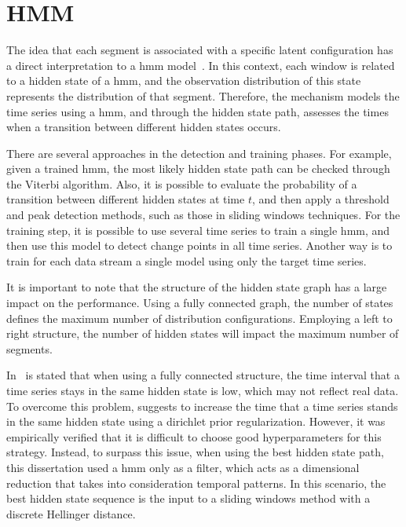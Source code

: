\section{HMM}

The idea that each segment is associated with a specific latent configuration
has a direct interpretation to a \gls*{hmm}
model~\cite{a_hidden_markov_model_segmentation_procedure_for_hydrological_and_environmental_time_series, fast_estimation_of_posterior_probabilities_in_change-point_analysis_through_a_constrained_hidden_markov_model, inertial_hidden_markov_models_modeling_change_in_multivariate_time_series}.
In this context, each window is related to a hidden state of a \gls*{hmm}, and the
observation distribution of this state represents the distribution of that
segment. Therefore, the mechanism models the time series using a \gls*{hmm}, and
through the hidden state path, assesses the times when a transition between
different hidden states occurs.

There are several approaches in the detection and training phases. For example,
given a trained \gls*{hmm}, the most likely hidden state path can be checked
through
the Viterbi algorithm. Also, it is possible to evaluate the probability of a
transition between different hidden states at time $t$, and then apply a
threshold and peak detection methods, such as those in sliding windows techniques.
For the training step, it is possible to use several time series to train a
single \gls*{hmm}, and then use this model to detect change points in all time series.
Another way is to train for each data stream a single model using only the
target time series.

It is important to note that the structure of the hidden state graph has a large
impact on the performance. Using a fully connected graph, the number of states
defines the maximum number of distribution configurations. Employing a left to
right structure, the number of hidden states will impact the maximum number of
segments.

In~\cite{inertial_hidden_markov_models_modeling_change_in_multivariate_time_series}
is stated that when using a fully connected structure, the time interval that a
time series stays in the same hidden state is low, which may not reflect real
data. To overcome this problem,
\cite{inertial_hidden_markov_models_modeling_change_in_multivariate_time_series}
suggests to increase the time that a time series stands in the same hidden
state using a dirichlet prior regularization. However, it was empirically
verified that it is difficult to choose good hyperparameters for this strategy.
Instead, to surpass this issue,
when using the best hidden state path, this dissertation used a \gls*{hmm} only as a
filter, which acts as a dimensional reduction that takes into consideration
temporal
patterns. In this scenario, the best hidden state sequence is the input to
a sliding windows method with a discrete Hellinger distance.

